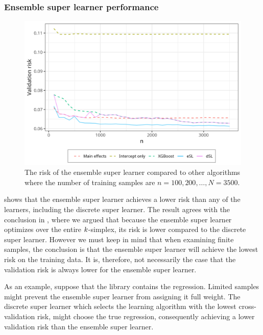 \documentclass[./main.tex]{subfiles}
\begin{document}
\subsubsection{Ensemble super learner performance}
\begin{figure}[H]
    \centering
    \includegraphics[width=\textwidth]{figures/losses_esl_s23.png}
    \caption{The risk of the ensemble super learner compared to other algorithms where the number of training samples are $n = 100, 200, \dots , N = 3500 $.}
    \label{fig:losses_esl_s23}
\end{figure}
 shows that the ensemble super learner achieves a lower risk than any of the learners, including the discrete super learner. The result agrees with the conclusion in , where we argued that because the ensemble super learner optimizes over the entire $ k $-simplex, its risk is lower compared to the discrete super learner. However we must keep in mind that when examining finite samples, the conclusion is that the ensemble super learner will achieve the lowest risk on the training data. It is, therefore, not necessarily the case that the validation risk is always lower for the ensemble super learner. 

As an example, suppose that the library contains the regression. Limited samples might prevent the ensemble super learner from assigning it full weight. The discrete super learner which selects the learning algorithm with the lowest cross-validation risk, might choose the true regression, consequently achieving a lower validation risk than the ensemble super learner.
\end{document}
